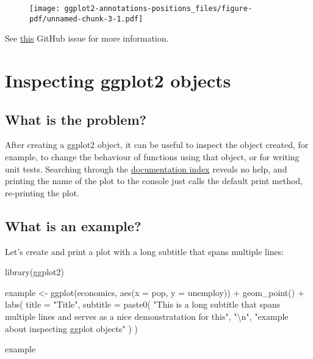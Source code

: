 \documentclass[
  letterpaper,
  DIV=11,
  numbers=noendperiod]{scrreprt}
\newenvironment{Shaded}{\begin{snugshade}}{\end{snugshade}}
\newcommand{\AttributeTok}[1]{\textcolor[rgb]{0.40,0.45,0.13}{#1}}
\newcommand{\FunctionTok}[1]{\textcolor[rgb]{0.28,0.35,0.67}{#1}}
\newcommand{\NormalTok}[1]{\textcolor[rgb]{0.00,0.23,0.31}{#1}}
\newcommand{\OtherTok}[1]{\textcolor[rgb]{0.00,0.23,0.31}{#1}}
\newcommand{\SpecialCharTok}[1]{\textcolor[rgb]{0.37,0.37,0.37}{#1}}
\newcommand{\StringTok}[1]{\textcolor[rgb]{0.13,0.47,0.30}{#1}}
\begin{document}
\begin{figure}[H]

{\centering \texttt{[image: ggplot2-annotations-positions\_files/figure-pdf/unnamed-chunk-3-1.pdf]}

}

\end{figure}

See \href{https://github.com/tidyverse/ggplot2/issues/4308}{this} GitHub
issue for more information.

\hypertarget{inspecting-ggplot2-objects}{%
\chapter{Inspecting ggplot2 objects}\label{inspecting-ggplot2-objects}}

\hypertarget{what-is-the-problem-2}{%
\section{What is the problem?}\label{what-is-the-problem-2}}

After creating a ggplot2 object, it can be useful to inspect the object
created, for example, to change the behaviour of functions using that
object, or for writing unit tests. Searching through the
\href{https://ggplot2.tidyverse.org/reference/index.html}{documentation
index} reveals no help, and printing the name of the plot to the console
just calls the default print method, re-printing the plot.

\hypertarget{what-is-an-example-2}{%
\section{What is an example?}\label{what-is-an-example-2}}

Let's create and print a plot with a long subtitle that spans multiple
lines:

\begin{Shaded}
\begin{Highlighting}[]
\FunctionTok{library}\NormalTok{(ggplot2)}

\NormalTok{example }\OtherTok{\textless{}{-}} \FunctionTok{ggplot}\NormalTok{(economics, }\FunctionTok{aes}\NormalTok{(}\AttributeTok{x =}\NormalTok{ pop, }\AttributeTok{y =}\NormalTok{ unemploy)) }\SpecialCharTok{+}
  \FunctionTok{geom\_point}\NormalTok{() }\SpecialCharTok{+}
  \FunctionTok{labs}\NormalTok{(}
    \AttributeTok{title =} \StringTok{"Title"}\NormalTok{,}
    \AttributeTok{subtitle =} \FunctionTok{paste0}\NormalTok{(}
      \StringTok{"This is a long subtitle that spans multiple lines and serves as a nice demonstratation for this"}\NormalTok{,}
      \StringTok{"}\SpecialCharTok{\textbackslash{}n}\StringTok{"}\NormalTok{,}
      \StringTok{"example about inspecting ggplot objects"}
\NormalTok{    )}
\NormalTok{  )}

\NormalTok{example}
\end{Highlighting}
\end{Shaded}
\end{document}
